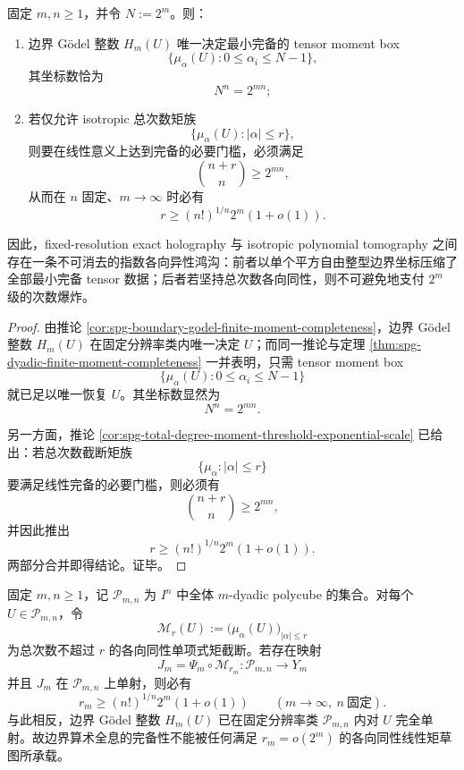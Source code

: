 \begin{theorem}\label{thm:conclusion-exact-holography-vs-isotropic-tomography-anisotropy-gap}
固定 \(m,n\ge 1\)，并令 \(N:=2^m\)。则：
\begin{enumerate}
  \item 边界 Gödel 整数 \(H_m(U)\) 唯一决定最小完备的 tensor moment box
        \[
        \{\mu_\alpha(U):0\le \alpha_i\le N-1\},
        \]
        其坐标数恰为
        \[
        N^n=2^{mn};
        \]
  \item 若仅允许 isotropic 总次数矩族
        \[
        \{\mu_\alpha(U):|\alpha|\le r\},
        \]
        则要在线性意义上达到完备的必要门槛，必须满足
        \[
        \binom{n+r}{n}\ge 2^{mn},
        \]
        从而在 \(n\) 固定、\(m\to\infty\) 时必有
        \[
        r\ge (n!)^{1/n}2^m(1+o(1)).
        \]
\end{enumerate}
因此，fixed-resolution exact holography 与 isotropic polynomial tomography 之间存在一条不可消去的指数各向异性鸿沟：前者以单个平方自由整型边界坐标压缩了全部最小完备 tensor 数据；后者若坚持总次数各向同性，则不可避免地支付 \(2^m\) 级的次数爆炸。
\end{theorem}

\begin{proof}
由推论 \ref{cor:spg-boundary-godel-finite-moment-completeness}，边界 Gödel 整数 \(H_m(U)\) 在固定分辨率类内唯一决定 \(U\)；而同一推论与定理 \ref{thm:spg-dyadic-finite-moment-completeness} 一并表明，只需 tensor moment box
\[
\{\mu_\alpha(U):0\le \alpha_i\le N-1\}
\]
就已足以唯一恢复 \(U\)。其坐标数显然为
\[
N^n=2^{mn}.
\]

另一方面，推论 \ref{cor:spg-total-degree-moment-threshold-exponential-scale} 已给出：若总次数截断矩族
\[
\{\mu_\alpha:|\alpha|\le r\}
\]
要满足线性完备的必要门槛，则必须有
\[
\binom{n+r}{n}\ge 2^{mn},
\]
并因此推出
\[
r\ge (n!)^{1/n}2^m(1+o(1)).
\]
两部分合并即得结论。证毕。
\end{proof}

\begin{corollary}\label{cor:conclusion-boundary-godel-vs-isotropic-moment-exponential-incompressibility}
固定 \(m,n\ge 1\)，记 \(\mathcal P_{m,n}\) 为 \(I^n\) 中全体 \(m\)-dyadic polycube 的集合。对每个 \(U\in \mathcal P_{m,n}\)，令
\[
\mathcal M_r(U):=\bigl(\mu_\alpha(U)\bigr)_{|\alpha|\le r}
\]
为总次数不超过 \(r\) 的各向同性单项式矩截断。若存在映射
\[
J_m=\Psi_m\circ \mathcal M_{r_m}:\mathcal P_{m,n}\to Y_m
\]
并且 \(J_m\) 在 \(\mathcal P_{m,n}\) 上单射，则必有
\[
r_m\ge (n!)^{1/n}2^m(1+o(1))
\qquad (m\to\infty,\ n\ \text{固定}).
\]
与此相反，边界 Gödel 整数 \(H_m(U)\) 已在固定分辨率类 \(\mathcal P_{m,n}\) 内对 \(U\) 完全单射。故边界算术全息的完备性不能被任何满足 \(r_m=o(2^m)\) 的各向同性线性矩草图所承载。
\end{corollary}

